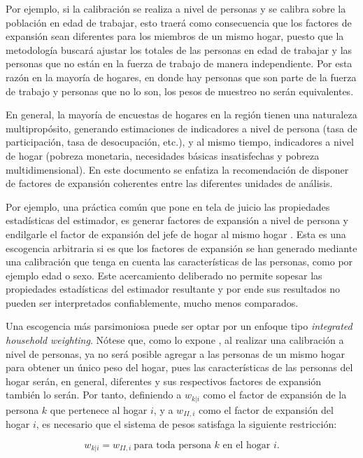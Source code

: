 \documentclass[
  12pt,
]{book}
\begin{document}
Por ejemplo, si la calibración se realiza a nivel de personas y se calibra sobre la población en edad de trabajar, esto traerá como consecuencia que los factores de expansión sean diferentes para los miembros de un mismo hogar, puesto que la metodología buscará ajustar los totales de las personas en edad de trabajar y las personas que no están en la fuerza de trabajo de manera independiente. Por esta razón en la mayoría de hogares, en donde hay personas que son parte de la fuerza de trabajo y personas que no lo son, los pesos de muestreo no serán equivalentes.

En general, la mayoría de encuestas de hogares en la región tienen una naturaleza multipropósito, generando estimaciones de indicadores a nivel de persona (tasa de participación, tasa de desocupación, etc.), y al mismo tiempo, indicadores a nivel de hogar (pobreza monetaria, necesidades básicas insatisfechas y pobreza multidimensional). En este documento se enfatiza la recomendación de disponer de factores de expansión coherentes entre las diferentes unidades de análisis.

Por ejemplo, una práctica común que pone en tela de juicio las propiedades estadísticas del estimador, es generar factores de expansión a nivel de persona y endilgarle el factor de expansión del jefe de hogar al mismo hogar \citep{Alexander_1987}. Esta es una escogencia arbitraria si es que los factores de expansión se han generado mediante una calibración que tenga en cuenta las características de las personas, como por ejemplo edad o sexo. Este acercamiento deliberado no permite sopesar las propiedades estadísticas del estimador resultante y por ende sus resultados no pueden ser interpretados confiablemente, mucho menos comparados.

Una escogencia más parsimoniosa puede ser optar por un enfoque tipo \emph{integrated household weighting}. Nótese que, como lo expone \citet{Heldal_1992}, al realizar una calibración a nivel de personas, ya no será posible agregar a las personas de un mismo hogar para obtener un único peso del hogar, pues las características de las personas del hogar serán, en general, diferentes y sus respectivos factores de expansión también lo serán. Por tanto, definiendo a \(w_{k|i}\) como el factor de expansión de la persona \(k\) que pertenece al hogar \(i\), y a \(w_{II,i}\) como el factor de expansión del hogar \(i\), es necesario que el sistema de pesos satisfaga la siguiente restricción:

\[
w_{k|i}=w_{II,i}\ \text{para toda persona $k$ en el hogar $i$}.
\]
\end{document}
